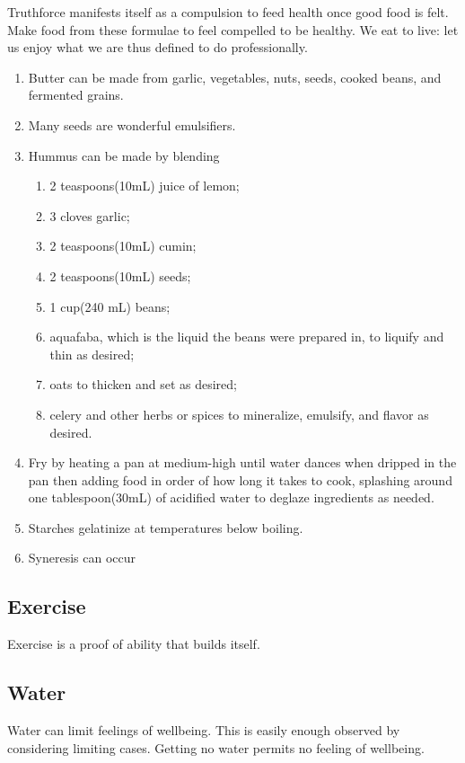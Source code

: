 \documentclass{book}
\begin{document}
Truthforce manifests itself as a compulsion to feed health once good food is felt.
Make food from these formulae to feel compelled to be healthy.
We eat to live: let us enjoy what we are thus defined to do professionally.

\begin{enumerate}
	\item Butter can be made from garlic, vegetables, nuts, seeds, cooked beans, and fermented grains.
	\item Many seeds are wonderful emulsifiers.
	\item Hummus can be made by blending
		\begin{enumerate} 
			\item 2 teaspoons(10mL) juice of lemon;
			\item 3 cloves garlic;
			\item 2 teaspoons(10mL) cumin;
			\item 2 teaspoons(10mL) seeds;
			\item 1 cup(240 mL) beans;
			\item aquafaba, which is the liquid the beans were prepared in, to liquify and thin as desired;
			\item oats to thicken and set as desired;
			\item celery and other herbs or spices to mineralize, emulsify, and flavor as desired.
		\end{enumerate}
	\item Fry by heating a pan at medium-high until water dances when dripped in the pan then adding food in order of how long it takes to cook, splashing around one tablespoon(30mL) of acidified water to deglaze ingredients as needed.
	\item Starches gelatinize at temperatures below boiling.
	\item Syneresis can occur 

\end{enumerate}

\subsection{Exercise}
Exercise is a proof of ability that builds itself.

\subsection{Water}
Water can limit feelings of wellbeing.
This is easily enough observed by considering limiting cases.
Getting no water permits no feeling of wellbeing.
\end{document}
